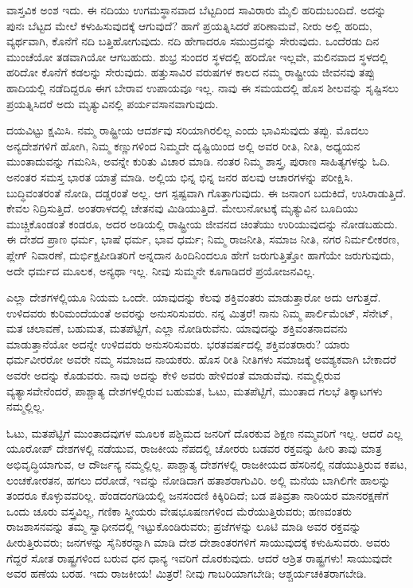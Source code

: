 ವಾಸ್ತವಿಕ ಅಂಶ ಇದು. ಈ ನದಿಯು ಉಗಮಸ್ಥಾನವಾದ ಬೆಟ್ಟದಿಂದ ಸಾವಿರಾರು ಮೈಲಿ ಹರಿದುಬಂದಿದೆ. ಅದನ್ನು ಪುನಃ ಬೆಟ್ಟದ ಮೇಲೆ ಕಳುಹಿಸುವುದಕ್ಕೆ ಆಗುವುದೆ? ಹಾಗೆ ಪ್ರಯತ್ನಿಸಿದರೆ ಪರಿಣಾಮವೆ, ನೀರು ಅಲ್ಲಿ ಹರಿದು, ವ್ಯರ್ಥವಾಗಿ, ಕೊನೆಗೆ ನದಿ ಬತ್ತಿಹೋಗುವುದು. ನದಿ ಹೇಗಾದರೂ ಸಮುದ್ರವನ್ನು ಸೇರುವುದು. ಒಂದೆರಡು ದಿನ ಮುಂಚೆಯೋ ತಡವಾಗಿಯೋ ಆಗಬಹುದು. ಶುಭ್ರ ಸುಂದರ ಸ್ಥಳದಲ್ಲಿ ಹರಿದೋ ಇಲ್ಲವೇ, ಮಲಿನವಾದ ಸ್ಥಳದಲ್ಲಿ ಹರಿದೋ ಕೊನೆಗೆ ಕಡಲನ್ನು ಸೇರುವುದು. ಹತ್ತುಸಾವಿರ ವರುಷಗಳ ಕಾಲದ ನಮ್ಮ ರಾಷ್ಟ್ರೀಯ ಜೀವನವು ತಪ್ಪು ಹಾದಿಯಲ್ಲಿ ನಡೆದಿದ್ದರೂ ಈಗ ಬೇರಾವ ಉಪಾಯವೂ ಇಲ್ಲ. ನಾವು ಈ ಸಮಯದಲ್ಲಿ ಹೊಸ ಶೀಲವನ್ನು ಸೃಷ್ಟಿಸಲು ಪ್ರಯತ್ನಿಸಿದರೆ ಅದು ಮೃತ್ಯುವಿನಲ್ಲಿ ಪರ್ಯವಸಾನವಾಗುವುದು.

ದಯವಿಟ್ಟು ಕ್ಷಮಿಸಿ. ನಮ್ಮ ರಾಷ್ಟ್ರೀಯ ಆದರ್ಶವು ಸರಿಯಾಗಿರಲಿಲ್ಲ ಎಂದು ಭಾವಿಸುವುದು ತಪ್ಪು. ಮೊದಲು ಅನ್ಯದೇಶಗಳಿಗೆ ಹೋಗಿ, ನಿಮ್ಮ ಕಣ್ಣುಗಳಿಂದ ನಿಮ್ಮದೇ ದೃಷ್ಟಿಯಿಂದ ಅಲ್ಲಿ ಅವರ ರೀತಿ, ನೀತಿ, ಅಧ್ಯಯನ ಮುಂತಾದುವನ್ನು ಗಮನಿಸಿ, ಅವನ್ನೇ ಕುರಿತು ವಿಚಾರ ಮಾಡಿ. ನಂತರ ನಿಮ್ಮ ಶಾಸ್ತ್ರ, ಪುರಾಣ ಸಾಹಿತ್ಯಗಳನ್ನು ಓದಿ. ಅನಂತರ ಸಮಸ್ತ ಭಾರತ ಯಾತ್ರೆ ಮಾಡಿ. ಅಲ್ಲಿಯ ಭಿನ್ನ ಭಿನ್ನ ಜನರ ಹಲವು ಆಚಾರಗಳನ್ನು ಪರೀಕ್ಷಿಸಿ. ಬುದ್ಧಿವಂತರಂತೆ ನೋಡಿ, ದಡ್ಡರಂತೆ ಅಲ್ಲ. ಆಗ ಸ್ಪಷ್ಟವಾಗಿ ಗೊತ್ತಾಗುವುದು. ಈ ಜನಾಂಗ ಬದುಕಿದೆ, ಉಸಿರಾಡುತ್ತಿದೆ. ಕೇವಲ ನಿದ್ರಿಸುತ್ತಿದೆ. ಅಂತರಾಳದಲ್ಲಿ ಚೇತನವು ಮಿಡಿಯುತ್ತಿದೆ. ಮೇಲುನೋಟಕ್ಕೆ ಮೃತ್ಯುವಿನ ಬೂದಿಯು ಮುಚ್ಚಿಕೊಂಡಂತೆ ಕಂಡರೂ, ಅದರ ಅಡಿಯಲ್ಲಿ ರಾಷ್ಟ್ರೀಯ ಜೀವನದ ಚಿಂತೆಯು ಉರಿಯುವುದನ್ನು ನೋಡಬಹುದು. ಈ ದೇಶದ ಪ್ರಾಣ ಧರ್ಮ, ಭಾಷೆ ಧರ್ಮ, ಭಾವ ಧರ್ಮ; ನಿಮ್ಮ ರಾಜನೀತಿ, ಸಮಾಜ ನೀತಿ, ನಗರ ನಿರ್ಮಲೀಕರಣ, ಪ್ಲೇಗ್​ ನಿವಾರಣೆ, ದುರ್ಭಿಕ್ಷಪೀಡಿತರಿಗೆ ಅನ್ನದಾನ ಹಿಂದಿನಿಂದಲೂ ಹೇಗೆ ಜರುಗುತ್ತಿತ್ತೋ ಹಾಗೆಯೇ ಜರುಗುವುದು, ಅದೇ ಧರ್ಮದ ಮೂಲಕ, ಅನ್ಯಥಾ ಇಲ್ಲ. ನೀವು ಸುಮ್ಮನೇ ಕೂಗಾಡಿದರೆ ಪ್ರಯೋಜನವಿಲ್ಲ.

ಎಲ್ಲಾ ದೇಶಗಳಲ್ಲಿಯೂ ನಿಯಮ ಒಂದೇ. ಯಾವುದನ್ನು ಕೆಲವು ಶಕ್ತಿವಂತರು ಮಾಡುತ್ತಾರೋ ಅದು ಆಗುತ್ತದೆ. ಉಳಿದವರು ಕುರಿಮಂದೆಯಂತೆ ಅವರನ್ನು ಅನುಸರಿಸುವರು. ನನ್ನ ಮಿತ್ರರೆ! ನಾನು ನಿಮ್ಮ ಪಾರ್ಲಿಮೆಂಟ್​, ಸೆನೇಟ್​, ಮತ ಚಲಾವಣೆ, ಬಹುಮತ, ಮತಪೆಟ್ಟಿಗೆ, ಎಲ್ಲಾ ನೋಡಿರುವೆನು. ಯಾವುದನ್ನು ಶಕ್ತಿವಂತನಾದವನು ಮಾಡುತ್ತಾನೆಯೋ ಅದನ್ನೇ ಉಳಿದವರು ಅನುಸರಿಸುವರು. ಭರತವರ್ಷದಲ್ಲಿ ಶಕ್ತಿ\break ವಂತರಾರು? ಯಾರು ಧರ್ಮವೀರರೋ ಅವರೇ ನಮ್ಮ ಸಮಾಜದ ನಾಯಕರು. ಹೊಸ ರೀತಿ ನೀತಿಗಳು ಸಮಾಜಕ್ಕೆ ಅವಶ್ಯಕವಾಗಿ ಬೇಕಾದರೆ ಅವರೇ ಅದನ್ನು ಕೊಡುವರು. ನಾವು ಅದನ್ನು ಕೇಳಿ ಅವರು ಹೇಳಿದಂತೆ ಮಾಡುವೆವು. ನಮ್ಮಲ್ಲಿರುವ ವ್ಯತ್ಯಾಸವೇನೆಂದರೆ, ಪಾಶ್ಚಾತ್ಯ ದೇಶಗಳಲ್ಲಿರುವ ಬಹುಮತ, ಓಟು, ಮತಪೆಟ್ಟಿಗೆ, ಮುಂತಾದ ಗಲಭೆ ತಿಕ್ಕಾಟಗಳು ನಮ್ಮಲ್ಲಿಲ್ಲ.

ಓಟು, ಮತಪೆಟ್ಟಿಗೆ ಮುಂತಾದವುಗಳ ಮೂಲಕ ಪಶ್ಚಿಮದ ಜನರಿಗೆ ದೊರಕುವ ಶಿಕ್ಷಣ ನಮ್ಮವರಿಗೆ ಇಲ್ಲ. ಆದರೆ ಎಲ್ಲ ಯೂರೋಪ್​ ದೇಶಗಳಲ್ಲಿ ನಡೆಯುವ, ರಾಜಕೀಯ ನೆಪದಲ್ಲಿ ಚೋರರು ಬಡವರ ರಕ್ತವನ್ನು ಹೀರಿ ತಾವು ಮಾತ್ರ ಅಭಿವೃದ್ಧಿಯಾಗುವ, ಆ ದೌರ್ಜನ್ಯ ನಮ್ಮಲ್ಲಿಲ್ಲ. ಪಾಶ್ಚಾತ್ಯ ದೇಶಗಳಲ್ಲಿ ರಾಜಕೀಯದ ಹೆಸರಿನಲ್ಲಿ ನಡೆಯುತ್ತಿರುವ ಕಪಟ, ಲಂಚಕೋರತನ, ಹಗಲು ದರೋಡೆ, ಇವನ್ನು ನೋಡಿದಾಗ ಹತಾಶರಾಗುವಿರಿ. ಅಲ್ಲಿ ಮನೆಯ ಬಾಗಿಲಿಗೇ ಹಾಲನ್ನು ತಂದರೂ ಕೊಳ್ಳುವವರಿಲ್ಲ. ಹೆಂಡದಂಗಡಿಯಲ್ಲಿ ಜನಸಂದಣಿ ಕಿಕ್ಕಿರಿದಿದೆ; ಬಡ ಪತಿವ್ರತಾ ನಾರಿಯರ ಮಾನರಕ್ಷಣೆಗೆ ಒಂದು ಚೂರು ವಸ್ತ್ರವಿಲ್ಲ, ಗಣಿಕಾ ಸ್ತ್ರೀಯರು ವೇಷಭೂಷಣಗಳಿಂದ ಮೆರೆಯುತ್ತಿರುವರು; ಹಣವಂತರು ರಾಜಶಾಸನವನ್ನು ತಮ್ಮ ಸ್ವಾಧೀನದಲ್ಲಿ ಇಟ್ಟುಕೊಂಡಿರುವರು; ಪ್ರಜೆಗಳನ್ನು ಲೂಟಿ ಮಾಡಿ ಅವರ ರಕ್ತವನ್ನು ಹೀರುತ್ತಿರುವರು; ಜನಗಳನ್ನು ಸೈನಿಕರನ್ನಾಗಿ ಮಾಡಿ ದೇಶ ದೇಶಾಂತರ\-ಗಳಿಗೆ ಸಾಯುವುದಕ್ಕೆ ಕಳುಹಿಸುವರು. ಅವರು ಗೆದ್ದರೆ ಸೋತ ರಾಷ್ಟ್ರಗಳಿಂದ ಬರುವ ಧನ ಧಾನ್ಯ ಇವರಿಗೆ ದೊರಕುವುದು. ಆದರೆ ಆಶ್ರಿತ ರಾಷ್ಟ್ರಗಳು! ಸಾಯುವುದೇ ಅವರ ಹಣೆಯ ಬರಹ. ಇದು ರಾಜಕೀಯ! ಮಿತ್ರರೆ! ನೀವು ಗಾಬರಿಯಾಗಬೇಡಿ; ಆಶ್ಚರ್ಯಚಕಿತರಾಗಬೇಡಿ.


